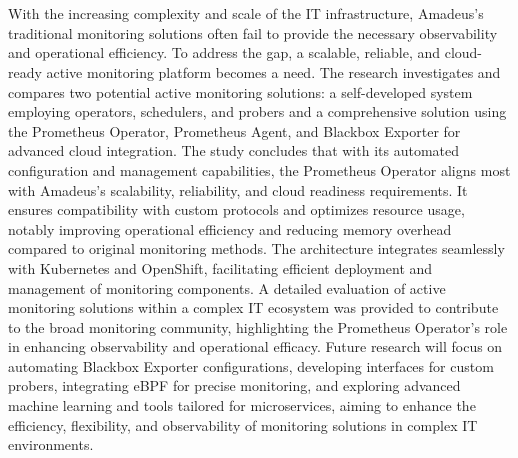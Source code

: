 \chapter{\abstractname}


With the increasing complexity and scale of the IT infrastructure, Amadeus's traditional monitoring solutions often fail to provide the necessary observability and operational efficiency. To address the gap, a scalable, reliable, and cloud-ready active monitoring platform becomes a need. The research investigates and compares two potential active monitoring solutions: a self-developed system employing operators, schedulers, and probers and a comprehensive solution using the Prometheus Operator, Prometheus Agent, and Blackbox Exporter for advanced cloud integration. The study concludes that with its automated configuration and management capabilities, the Prometheus Operator aligns most with Amadeus's scalability, reliability, and cloud readiness requirements. It ensures compatibility with custom protocols and optimizes resource usage, notably improving operational efficiency and reducing memory overhead compared to original monitoring methods. The architecture integrates seamlessly with Kubernetes and OpenShift, facilitating efficient deployment and management of monitoring components. A detailed evaluation of active monitoring solutions within a complex IT ecosystem was provided to contribute to the broad monitoring community, highlighting the Prometheus Operator's role in enhancing observability and operational efficacy. Future research will focus on automating Blackbox Exporter configurations, developing interfaces for custom probers, integrating \ac{eBPF} for precise monitoring, and exploring advanced machine learning and tools tailored for microservices, aiming to enhance the efficiency, flexibility, and observability of monitoring solutions in complex IT environments. 